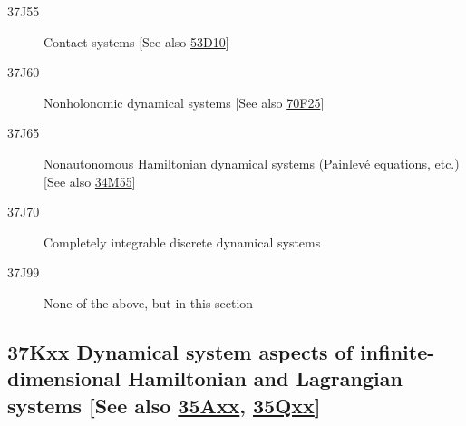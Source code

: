 \begin{description}
\item [37J55]\label{37J55} Contact systems [See also \hyperref[53D10]{53D10}]
\item [37J60]\label{37J60} Nonholonomic  dynamical systems [See also \hyperref[70F25]{70F25}]
\item [37J65]\label{37J65} Nonautonomous Hamiltonian dynamical systems (Painlev\'e equations, etc.) [See also \hyperref[34M55]{34M55}]
\item [37J70]\label{37J70} Completely integrable discrete  dynamical systems
\item [37J99]\label{37J99} None of the above, but in this section
\end{description}
\subsection*{37Kxx Dynamical system aspects of infinite-dimensional Hamiltonian and Lagrangian systems [See also \hyperref[35Axx]{35Axx}, \hyperref[35Qxx]{35Qxx}] }\label{37Kxx}

